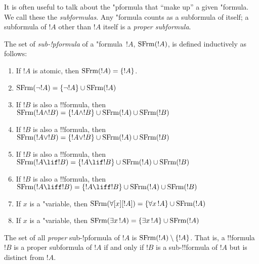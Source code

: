 \documentclass[../../include/open-logic-section]{subfiles}
\begin{document}


\begin{explain}
It is often useful to talk about the "p{formula} that ``make up'' a given
"{formula}.  We call these the \emph{subformulas}.  Any "{formula} counts as
a subformula of itself; a subformula of $!A$ other than $!A$ itself is
a \emph{proper subformula}.
\end{explain}

\begin{defn}
The set of \emph{sub-!p{formula}} of a "{formula}~$!A$,
$\mathrm{SFrm}({!A})$, is defined inductively as follows:
\begin{enumerate}
\item If $!A$ is atomic, then $\mathrm{SFrm}({!A}) = \{!A\}$.
\item $\mathrm{SFrm}({\lnot !A}) = \{\lnot !A\} \cup \mathrm{SFrm}({!A})$
\item If $!B$ is also a !!{formula}, then $\mathrm{SFrm}({!A \land !B}) = \{!A
  \land !B\} \cup \mathrm{SFrm}({!A}) \cup \mathrm{SFrm}({!B})$
\item If $!B$ is also a !!{formula}, then $\mathrm{SFrm}({!A \lor !B}) = \{!A \lor
  !B\} \cup \mathrm{SFrm}({!A}) \cup \mathrm{SFrm}({!B})$
\item If $!B$ is also a !!{formula}, then $\SubFrm{!A \lif !B} = \{!A \lif
  !B\} \cup \SubFrm{!A} \cup \SubFrm{!B}$
\item If $!B$ is also a !!{formula}, then $\SubFrm{!A \liff !B} = \{!A
  \liff !B\} \cup \SubFrm{!A} \cup \SubFrm{!B}$
\item If $x$ is a "{variable}, then $\SubFrm{\forall[x][!A]} =
  \{\lforall[x][!A]\} \cup \SubFrm{!A}$
\item If $x$ is a "{variable}, then $\SubFrm{\lexists[x][!A]} =
  \{\lexists[x][!A]\} \cup \SubFrm{!A}$
\end{enumerate}
The set of all \emph{proper} sub-!p{formula} of $!A$ is $\mathrm{SFrm}({!A}) \setminus
\{!A\}$. That is, a !!{formula} $!B$ is a proper subformula of $!A$ if and
only if $!B$ is a sub-!!{formula} of $!A$ but is distinct from $!A$.
\end{defn}

\end{document}
